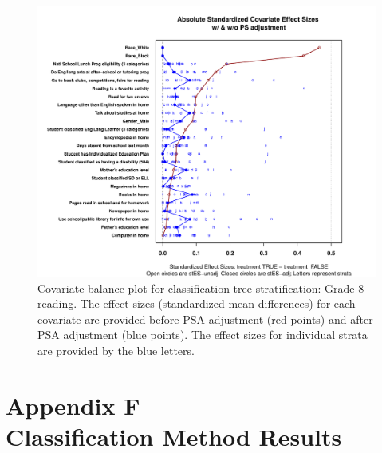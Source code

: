\begin{figure}
\begin{center}
\includegraphics[width=\textwidth]{../Figures2009/g8read-tree-balance.pdf}
\caption[Covariate balance plot for classification tree stratification: Grade 8 reading]{Covariate balance plot for classification tree stratification: Grade 8 reading. The effect sizes (standardized mean differences) for each covariate are provided before PSA adjustment (red points) and after PSA adjustment (blue points). The effect sizes for individual strata are provided by the blue letters.}
\end{center}
\end{figure}

\clearpage
{}
\section*{Appendix F\\Classification Method Results}
\label{appendixF}




